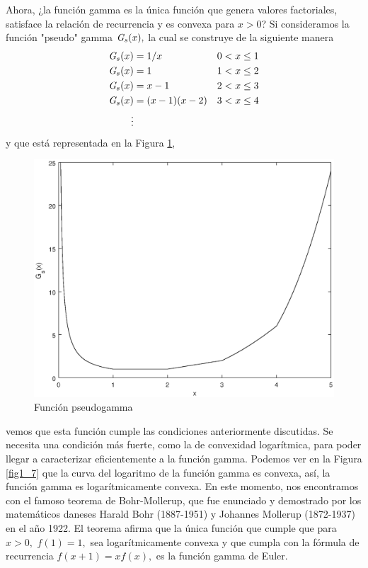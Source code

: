 Ahora, ¿la función gamma es la única función que genera valores factoriales, satisface la relación de recurrencia y es convexa para $x>0$? Si consideramos la función "pseudo" gamma $\emph{G}_s(x),$ la cual se construye de la siguiente manera 
\begin{align*}
	\emph{G}_s(x) &= 1/x \hspace{1cm}\ &0 < x \leq 1 \\
	\emph{G}_s(x) &= 1				&1 < x \leq 2\\
	\emph{G}_s(x) &= x-1 				&2 < x \leq 3\\
	\emph{G}_s(x) &= (x-1)(x-2)		&3 < x \leq 4\\
	\vdots
\end{align*}
y que está representada en la Figura \ref{fig1_6},
\begin{figure}[htbp]
	\begin{center}
		\includegraphics[scale=0.5]{figura1_6.eps}
	\end{center}
\caption{Función pseudogamma}
\label{fig1_6}
\end{figure}
vemos que esta función cumple las condiciones anteriormente discutidas. Se necesita una condición más fuerte, como la de convexidad logarítmica, para poder llegar a caracterizar eficientemente a la función gamma. Podemos ver en la Figura \ref{fig1_7} que la curva del logaritmo de la función gamma es convexa, así, la función gamma es logarítmicamente convexa. En este momento, nos encontramos con el famoso teorema de Bohr-Mollerup, que fue enunciado y demostrado por los matemáticos daneses Harald Bohr (1887-1951) y Johannes Mollerup (1872-1937) en el año 1922. El teorema afirma que la única función que cumple que para $x>0,$ $f(1) = 1,$ sea logarítmicamente convexa y que cumpla con la fórmula de recurrencia $f(x+1) = xf(x),$ es la función gamma de Euler.
